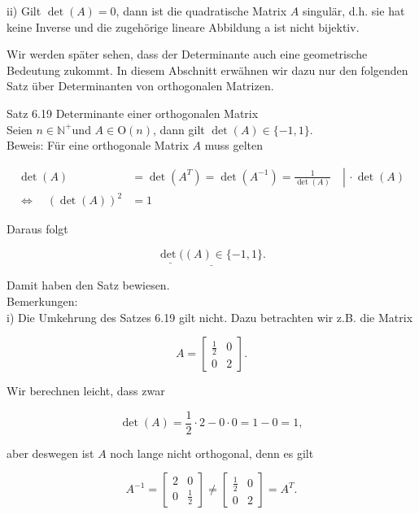 \documentclass[10pt]{article}
\begin{document}
ii) Gilt $\operatorname{det}(A)=0$, dann ist die quadratische Matrix $A$ singulär, d.h. sie hat keine Inverse und die zugehörige lineare Abbildung a ist nicht bijektiv.

Wir werden später sehen, dass der Determinante auch eine geometrische Bedeutung zukommt. In diesem Abschnitt erwähnen wir dazu nur den folgenden Satz über Determinanten von orthogonalen Matrizen.

Satz 6.19 Determinante einer orthogonalen Matrix\\
Seien $n \in \mathbb{N}^{+}$und $A \in \mathrm{O}(n)$, dann gilt $\operatorname{det}(A) \in\{-1,1\}$.\\
Beweis: Für eine orthogonale Matrix $A$ muss gelten


\begin{align*}
\operatorname{det}(A) & \left.=\operatorname{det}\left(A^{T}\right)=\operatorname{det}\left(A^{-1}\right)=\frac{1}{\operatorname{det}(A)} \quad \right\rvert\, \cdot \operatorname{det}(A)  \tag{6.126}\\
\Leftrightarrow \quad(\operatorname{det}(A))^{2} & =1 \tag{6.127}
\end{align*}


Daraus folgt


\begin{equation*}
\underline{\underline{\operatorname{det}( }(A) \in\{-1,1\} .} \tag{6.128}
\end{equation*}


Damit haben den Satz bewiesen.\\
Bemerkungen:\\
i) Die Umkehrung des Satzes 6.19 gilt nicht. Dazu betrachten wir z.B. die Matrix

\[
A=\left[\begin{array}{cc}
\frac{1}{2} & 0  \tag{6.129}\\
0 & 2
\end{array}\right] .
\]

Wir berechnen leicht, dass zwar


\begin{equation*}
\operatorname{det}(A)=\frac{1}{2} \cdot 2-0 \cdot 0=1-0=1, \tag{6.130}
\end{equation*}


aber deswegen ist $A$ noch lange nicht orthogonal, denn es gilt

\[
A^{-1}=\left[\begin{array}{cc}
2 & 0  \tag{6.131}\\
0 & \frac{1}{2}
\end{array}\right] \neq\left[\begin{array}{cc}
\frac{1}{2} & 0 \\
0 & 2
\end{array}\right]=A^{T} .
\]
\end{document}
